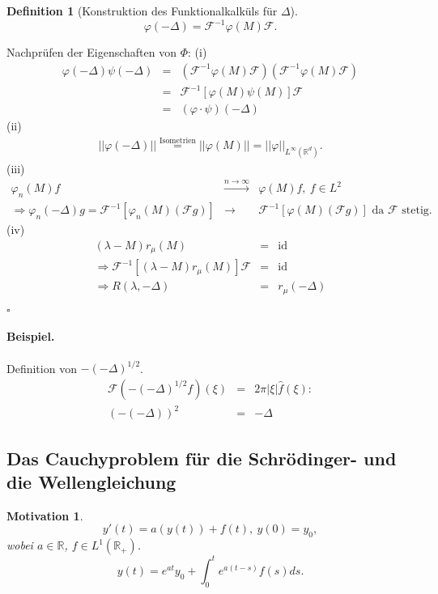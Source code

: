 \documentclass[12pt,a4paper,titlepage]{scrartcl}
\newtheorem{Definition}[Satz]{Definition}
\newtheorem{Motivation}[Satz]{Motivation}
\DeclareMathOperator{\id}{id}
\numberwithin{equation}{section}
\newcommand{\R}{\mathbb{R}} %
\newcommand{\f}{\hat{f}}
\newcommand{\F}{\mathcal{F}}
\newcommand{\m}{\cdot}
\newcommand{\laplace}{\Delta}
\newcommand{\qed}{\begin{flushright}
		$\square$
	\end{flushright}}
\begin{document}
	\begin{Definition}[Konstruktion des Funktionalkalküls für $\laplace$]
		$$\varphi(-\laplace) = \F^{-1}\varphi(M)\F.$$
	\end{Definition}
	
	Nachprüfen der Eigenschaften von $\Phi$: (i)
	\begin{eqnarray}
		\varphi(-\laplace)\psi(-\laplace) &=& \left(\F^{-1}\varphi(M)\F \right)\left(\F^{-1}\varphi(M)\F \right)\nonumber\\
		&=&\F^{-1}[\varphi(M)\psi(M)]\F \nonumber\\
		&=& (\varphi\m \psi)(-\laplace)\nonumber
	\end{eqnarray}
	(ii)
	\begin{eqnarray}
		||\varphi(-\laplace)|| \overset{\text{Isometrien}}{=}||\varphi(M)|| =||\varphi||_{L^{\infty}(\R^d)}.\nonumber
	\end{eqnarray}
	(iii) 
	\begin{eqnarray}
		\varphi_n(M)f&\overset{n\rightarrow\infty}{\longrightarrow}&\varphi(M)f,~f\in L^2\nonumber\\
		\Rightarrow \varphi_n(-\laplace)g = \F^{-1}[\varphi_n(M)(\F g)]&\rightarrow &\F^{-1}[\varphi(M)(\F g)] \text{ da }\F\text{ stetig.}\nonumber
	\end{eqnarray}
	(iv)
	\begin{eqnarray}
		(\lambda-M)r_\mu(M)&=& \id\nonumber\\
		\Rightarrow \F^{-1}[(\lambda-M)r_\mu(M)]\F &=&\id\nonumber\\
		\Rightarrow R(\lambda,-\laplace) &=& r_\mu(-\laplace)\nonumber
	\end{eqnarray}
	\qed
	
	\paragraph{Beispiel.} Definition von $-(-\laplace)^{1/2}$.
	\begin{eqnarray}
		\F(-(-\laplace)^{1/2} f)(\xi) &=& 2\pi|\xi|\f(\xi):\nonumber\\
		(-(-\laplace))^2 &=& -\laplace\nonumber
	\end{eqnarray}
	
	\subsection{Das Cauchyproblem für die Schrödinger- und die Wellengleichung}
	
	\begin{Motivation}
		$$y'(t) = a(y(t))+ f(t), ~y(0) = y_0,$$
		wobei $a\in \R$, $f\in L^1(\R_+)$.
		$$y(t) = e^{at}y_0+\int_{0}^{t}e^{a(t-s)}f(s)ds.$$
	\end{Motivation}
	
\end{document}
